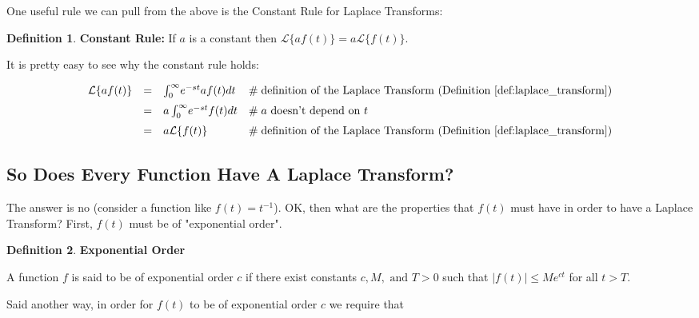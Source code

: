 \documentclass{article}
\theoremstyle{definition}
\newtheorem{definition}{Definition}[section]
\begin{document}
\bigskip
\noindent
One useful rule we can pull from the above is the Constant Rule for Laplace Transforms:

\bigskip
\begin{definition} 
{\bf Constant Rule: } If $a$ is a constant then $\mathcal{L}\{a f(t)\} = a \mathcal{L}\{f(t)\}$.
\label{def:constant_rule}
\end{definition}

\bigskip
\noindent
It is pretty easy to see why the constant rule holds:

\begin{equation*}
\begin{array}{lllll}
\mathcal{L}\{af(t)\} 
&=& \int_0^\infty \! e^{-st} a f(t) dt                 & \mathrel{\#} \text{definition of the Laplace Transform (Definition \ref{def:laplace_transform})}   \\  
[6pt]                                                              %
&=& a \int_0^\infty \! e^{-st} f(t) dt                 & \mathrel{\#} \text{$a$ doesn't depend on $t$}                                                                              \\  
[6pt]                                                              %
&=& a \mathcal{L}\{f(t)\}                               & \mathrel{\#} \text{definition of the Laplace Transform  (Definition \ref{def:laplace_transform})}
\end{array}
\end{equation*}


\smallskip
\subsection{So Does Every Function Have A Laplace Transform?}
The answer is no (consider a function like $f(t) = t^{-1}$). OK, then what are the properties that $f(t)$ must have in order to have a Laplace Transform? First, $f(t)$ must
be of "exponential order". 


\bigskip
\begin{definition} 
{\bf Exponential Order}
\label{def:exponential_order}
\end{definition}
\noindent
A function $f$ is said to be of exponential order $c$ if there exist constants $c, M, \text{ and } T > 0$ such that $|f(t)| \leq Me^{ct}$ for all $t > T$.

\bigskip
\noindent
Said another way, in order for $f(t)$ to be of exponential order $c$ we require that  
\end{document}
